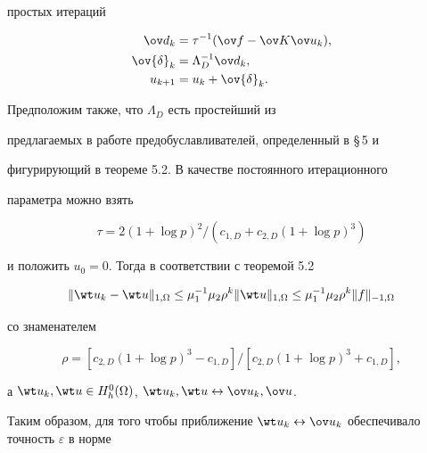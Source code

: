простых итераций


\begin{align}


\label{7.1}


\ov d_k&=\tau^{-1}(\ov f-\ov K\ov u_k), \\


\label{7.2} 


\ov {\delta}_k&={\Lambda}^{-1}_D \ov d_k, \\


\label{7.3}


u_{k+1}&=u_k+\ov{\delta}_k.


\end{align} 


Предположим также, что ${\Lambda}_D$ есть простейший из


предлагаемых в работе предобуславливателей, определенный в \S\,5 и 


фигурирующий в теореме 5.2. В качестве постоянного итерационного 


параметра можно взять 


\begin{equation}\label{7.4} 


\tau =2(1+\log p)^2/(c_{1,D}+c_{2,D}(1+\log p)^3)


\end{equation}


и положить $u_0=0$. Тогда в соответствии с теоремой 5.2


\begin{equation}\label{7.5}


\|\wt u_k-\wt u\|_{1,\Omega}\leq {\mu}_1^{-1}{\mu}_2


{\rho}^k\|\wt u\|_{1,\Omega}\leq {\mu}_1^{-1}{\mu}_2{\rho}^k 


\|f\|_{-1,\Omega}


\end{equation}


со знаменателем 


\begin{equation}\label{7.6}


{\rho}=[c_{2,D}(1+\log p)^3-c_{1,D}]/[c_{2,D}(1+\log p)^3+c_{1,D}],


\end{equation}


а $\wt u_k,\wt u\in H^0_h(\Omega)$, $\wt u_k,\wt u \leftrightarrow {\ov 


u}_k,{\ov u}$.


Таким образом, для того чтобы приближение $\wt u_k\leftrightarrow {\ov 


u}_k$ обеспечивало точность $\varepsilon$ в норме 



